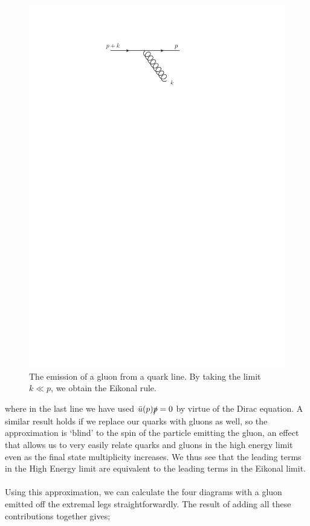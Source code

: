 \begin{figure}[t]
\centering
\includegraphics[scale=1.5]{Images/eikonal.pdf} 
\caption{The emission of a gluon from a quark line. By taking the limit $k \ll p$, we obtain the Eikonal rule.}
\label{fig:eikonal}
\end{figure}

where in the last line we have used $\bar{u}(p) \slashed{p} = 0$ by virtue of the Dirac equation. A similar result holds if we replace our quarks with gluons as well, so the approximation is `blind' to the spin of the particle emitting the gluon, an effect that allows us to very easily relate quarks and gluons in the high energy limit even as the final state multiplicity increases. We thus see that the leading terms in the High Energy limit are equivalent to the leading terms in the Eikonal limit. \\
\\
Using this approximation, we can calculate the four diagrams with a gluon emitted off the extremal legs straightforwardly. The result of adding all these contributions together gives;

